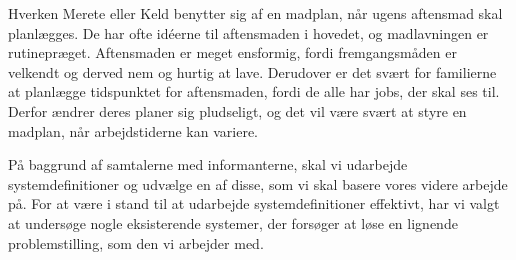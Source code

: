 Hverken Merete eller Keld benytter sig af en madplan, når ugens aftensmad skal planlægges. De har ofte idéerne til aftensmaden i hovedet, og madlavningen er rutinepræget. Aftensmaden er meget ensformig, fordi fremgangsmåden er velkendt og derved nem og hurtig at lave. Derudover er det svært for familierne at planlægge tidspunktet for aftensmaden, fordi de alle har jobs, der skal ses til. Derfor ændrer deres planer sig pludseligt, og det vil være svært at styre en madplan, når arbejdstiderne kan variere.

På baggrund af samtalerne med informanterne, skal vi udarbejde systemdefinitioner og udvælge en af disse, som vi skal basere vores videre arbejde på. For at være i stand til at udarbejde systemdefinitioner effektivt, har vi valgt at undersøge nogle eksisterende systemer, der forsøger at løse en lignende problemstilling, som den vi arbejder med.